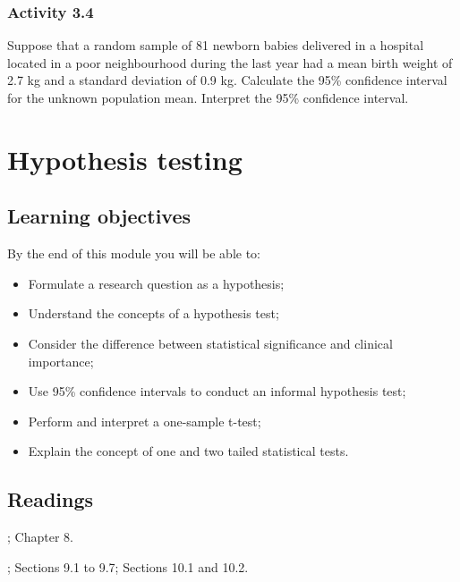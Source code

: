 \documentclass[
]{memoir}
\providecommand{\tightlist}{%
  \setlength{\itemsep}{0pt}\setlength{\parskip}{0pt}}
\begin{document}
\hypertarget{activity-3.4}{%
\subsection*{Activity 3.4}\label{activity-3.4}}

Suppose that a random sample of 81 newborn babies delivered in a hospital located in a poor neighbourhood during the last year had a mean birth weight of 2.7 kg and a standard deviation of 0.9 kg. Calculate the 95\% confidence interval for the unknown population mean. Interpret the 95\% confidence interval.

\hypertarget{hypothesis-testing}{%
\chapter{Hypothesis testing}\label{hypothesis-testing}}

\hypertarget{learning-objectives-3}{%
\section*{Learning objectives}\label{learning-objectives-3}}

By the end of this module you will be able to:

\begin{itemize}
\tightlist
\item
  Formulate a research question as a hypothesis;
\item
  Understand the concepts of a hypothesis test;
\item
  Consider the difference between statistical significance and clinical importance;
\item
  Use 95\% confidence intervals to conduct an informal hypothesis test;
\item
  Perform and interpret a one-sample t-test;
\item
  Explain the concept of one and two tailed statistical tests.
\end{itemize}

\hypertarget{readings-3}{%
\section*{Readings}\label{readings-3}}

\citet{kirkwood_sterne01a}; Chapter 8.

\citet{bland15b}; Sections 9.1 to 9.7; Sections 10.1 and 10.2.
\end{document}
